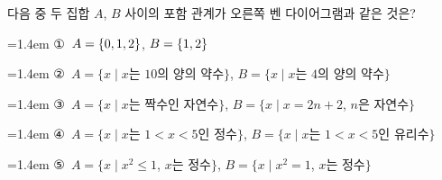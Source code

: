 \noindent\begin{minipage}[t]{0.58\linewidth}\vspace{0pt}\raggedright 다음 중 두 집합 $A$, $B$ 사이의 포함 관계가 오른쪽 벤 다이어그램과 같은 것은?\end{minipage}\hfill\begin{minipage}[t]{0.4\linewidth}\vspace{0pt}\centering \resizebox{\ifdim\width>\linewidth\linewidth\else\width\fi}{!}{}\end{minipage}\par
\par\medskip\par\noindent\hangindent=1.4em {\small ①}\ $A=\{0{,}\mkern3mu\mathopen{}1{,}\mkern3mu\mathopen{}2\}$, $B=\{1{,}\mkern3mu\mathopen{}2\}$\par\noindent\hangindent=1.4em {\small ②}\ $A=\{x \mid x$는 $10$의 양의 약수$\}$, $B=\{x \mid x$는 $4$의 양의 약수$\}$\par\noindent\hangindent=1.4em {\small ③}\ $A=\{x \mid x$는 짝수인 자연수$\}$, $B=\{x \mid x=2n+2$, $n$은 자연수$\}$\par\noindent\hangindent=1.4em {\small ④}\ $A=\{x \mid x$는 $1<x<5$인 정수$\}$, $B=\{x \mid x$는 $1<x<5$인 유리수$\}$\par\noindent\hangindent=1.4em {\small ⑤}\ $A=\{x \mid x^2\le 1$, $x$는 정수$\}$, $B=\{x \mid x^2=1$, $x$는 정수$\}$\par\medskip
